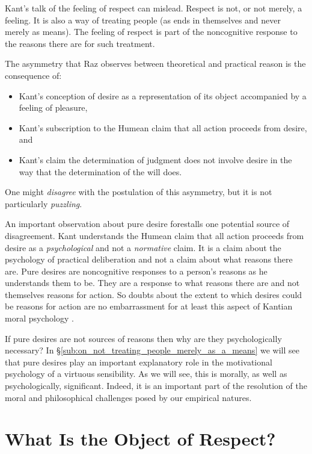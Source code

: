 \documentclass[a4paper,12pt]{article}
\begin{document}
Kant's talk of the feeling of respect can mislead. Respect is not, or not merely, a feeling. It is also a way of treating people (as ends in themselves and never merely as means). The feeling of respect is part of the noncognitive response to the reasons there are for such treatment.

The asymmetry that Raz observes between theoretical and practical reason is the consequence of: 
\begin{itemize}
	\item Kant's conception of desire as a representation of its object accompanied by a feeling of pleasure, 
	\item Kant's subscription to the Humean claim that all action proceeds from desire, and 
	\item Kant's claim the determination of judgment does not involve desire in the way that the determination of the will does. 
\end{itemize}
One might \emph{disagree} with the postulation of this asymmetry, but it is not particularly \emph{puzzling}.

An important observation about pure desire forestalls one potential source of disagreement. Kant understands the Humean claim that all action proceeds from desire as a \emph{psychological} and not a \emph{normative} claim. It is a claim about the psychology of practical deliberation and not a claim about what reasons there are. Pure desires are noncognitive responses to a person's reasons as he understands them to be. They are a response to what reasons there are and not themselves reasons for action. So doubts about the extent to which desires could be reasons for action are no embarrassment for at least this aspect of Kantian moral psychology \citep[for such doubts see, inter alia,][]{Scanlon:1998hb, Raz:2000tm}. 

If pure desires are not sources of reasons then why are they psychologically necessary? In \S\ref{sub:on_not_treating_people_merely_as_a_means} we will see that pure desires play an important explanatory role in the motivational psychology of a virtuous sensibility. As we will see, this is morally, as well as psychologically, significant. Indeed, it is an important part of the resolution of the moral and philosophical challenges posed by our empirical natures.


\section{What Is the Object of Respect?} \label{sec:what_is_the_object_of_respect} %
\end{document}
